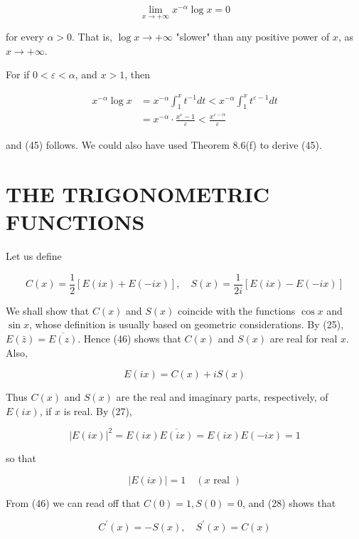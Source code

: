 \documentclass[10pt]{article}
\begin{document}
\begin{equation*}
\lim _{x \rightarrow+\infty} x^{-\alpha} \log x=0 \tag{45}
\end{equation*}


for every $\alpha>0$. That is, $\log x \rightarrow+\infty$ "slower" than any positive power of $x$, as $x \rightarrow+\infty$.

For if $0<\varepsilon<\alpha$, and $x>1$, then

$$
\begin{aligned}
x^{-\alpha} \log x & =x^{-\alpha} \int_{1}^{x} t^{-1} d t<x^{-\alpha} \int_{1}^{x} t^{\varepsilon-1} d t \\
& =x^{-\alpha} \cdot \frac{x^{\varepsilon}-1}{\varepsilon}<\frac{x^{\varepsilon-\alpha}}{\varepsilon}
\end{aligned}
$$

and (45) follows. We could also have used Theorem 8.6(f) to derive (45).

\section*{THE TRIGONOMETRIC FUNCTIONS}
Let us define


\begin{equation*}
C(x)=\frac{1}{2}[E(i x)+E(-i x)], \quad S(x)=\frac{1}{2 i}[E(i x)-E(-i x)] \tag{46}
\end{equation*}


We shall show that $C(x)$ and $S(x)$ coincide with the functions $\cos x$ and $\sin x$, whose definition is usually based on geometric considerations. By (25), $E(\bar{z})= \overline{E(z)}$. Hence (46) shows that $C(x)$ and $S(x)$ are real for real $x$. Also,


\begin{equation*}
E(i x)=C(x)+i S(x) \tag{47}
\end{equation*}


Thus $C(x)$ and $S(x)$ are the real and imaginary parts, respectively, of $E(i x)$, if $x$ is real. By (27),

$$
|E(i x)|^{2}=E(i x) \overline{E(i x)}=E(i x) E(-i x)=1
$$

so that


\begin{equation*}
|E(i x)|=1 \quad(x \text { real }) \tag{48}
\end{equation*}


From (46) we can read off that $C(0)=1, S(0)=0$, and (28) shows that


\begin{equation*}
C^{\prime}(x)=-S(x), \quad S^{\prime}(x)=C(x) \tag{49}
\end{equation*}
\end{document}
